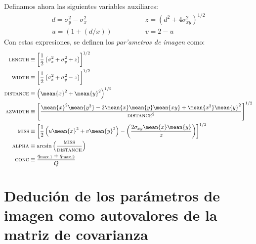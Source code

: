 Definamos ahora las siguientes variables auxiliares:
%
\begin{equation}
\label{eq:auxiliary}
\begin{split}
  d = \sigma_y^2 - \sigma_x^2 &\qquad\qquad
  z = \left(d^2+4\sigma_{xy}^2\right)^{1/2} \\
  u = \left(1+(d/x)\right) &\qquad\qquad
  v = 2 - u
\end{split}
\end{equation}
Con estas expresiones, se definen los \emph{par'ametros de imagen}
como:
%
\begin{subequations}
  \label{eq:imageparams}
  \begin{align}
%
    \label{eq:lengthdef}
    \text{\scshape length} &\equiv 
    \left[\frac{1}{2}\left(\sigma_x^2+\sigma_y^2+z\right)\right]^{1/2}\\
%
    \label{eq:widthdef}
    \text{\scshape width} &\equiv 
    \left[\frac{1}{2}\left(\sigma_x^2+\sigma_y^2-z\right)\right]^{1/2}\\
%
    \label{eq:distdef}
    \text{\scshape distance} &\equiv 
    \left(\mean{x}^2 + \mean{y}^2\right)^{1/2}\\
%
    \label{eq:azwidthdef}
    \text{\scshape azwidth} &\equiv 
    \left[\frac{\mean{x}^2\mean{y^2} 
        - 2\mean{x}\mean{y}\mean{xy} 
        + \mean{x^2}\mean{y}^2}{\text{\scshape distance}^2}\right]^{1/2}\\
%
    \label{eq:missdef}
    \text{\scshape miss} &\equiv 
    \left[\frac{1}{2}\left(u\mean{x}^2 + v\mean{y}^2\right)
        - \left(\frac{2\sigma_{xy}\mean{x}\mean{y}}{z}\right)\right]^{1/2}\\
%
    \label{eq:alphadef}
    \text{\scshape alpha} &\equiv
    \arcsin\left(\frac{\text{\scshape miss}}{\text{\scshape distance}}\right)\\
%
    \label{eq:concdef}
    \text{\scshape conc} &\equiv
    \frac{q_{\mathrm{max.1}} + q_{\mathrm{max.2}}}{Q}
%
  \end{align}
\end{subequations}

\imageparaxesfig


\section{Deduci\'on de los par\'ametros de imagen como autovalores de la
  matriz de covarianza}

